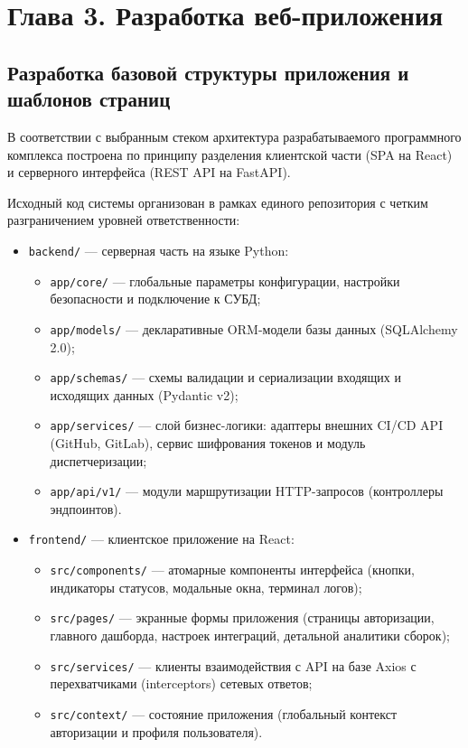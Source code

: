 \section*{Глава 3. Разработка веб-приложения}

\subsection{Разработка базовой структуры приложения и шаблонов страниц}

В соответствии с выбранным стеком архитектура разрабатываемого программного комплекса построена по принципу разделения клиентской части (SPA на React) и серверного интерфейса (REST API на FastAPI).

Исходный код системы организован в рамках единого репозитория с четким разграничением уровней ответственности:
\begin{itemize}
    \item \texttt{backend/} --- серверная часть на языке Python:
    \begin{itemize}
        \item \texttt{app/core/} --- глобальные параметры конфигурации, настройки безопасности и подключение к СУБД;
        \item \texttt{app/models/} --- декларативные ORM-модели базы данных (SQLAlchemy 2.0);
        \item \texttt{app/schemas/} --- схемы валидации и сериализации входящих и исходящих данных (Pydantic v2);
        \item \texttt{app/services/} --- слой бизнес-логики: адаптеры внешних CI/CD API (GitHub, GitLab), сервис шифрования токенов и модуль диспетчеризации;
        \item \texttt{app/api/v1/} --- модули маршрутизации HTTP-запросов (контроллеры эндпоинтов).
    \end{itemize}
    \item \texttt{frontend/} --- клиентское приложение на React:
    \begin{itemize}
        \item \texttt{src/components/} --- атомарные компоненты интерфейса (кнопки, индикаторы статусов, модальные окна, терминал логов);
        \item \texttt{src/pages/} --- экранные формы приложения (страницы авторизации, главного дашборда, настроек интеграций, детальной аналитики сборок);
        \item \texttt{src/services/} --- клиенты взаимодействия с API на базе Axios с перехватчиками (interceptors) сетевых ответов;
        \item \texttt{src/context/} --- состояние приложения (глобальный контекст авторизации и профиля пользователя).
    \end{itemize}
\end{itemize}

